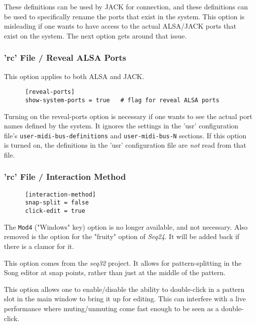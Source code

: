    These definitions can be used by JACK for connection, and these
   definitions can be used to specifically rename the ports that exist in the
   system.
   This option is misleading if one wants to have access to the
   actual ALSA/JACK ports that exist on the system.
   The next option gets around that issue.

\subsubsection{'rc' File / Reveal ALSA Ports}
\label{subsubsec:configuration_rc_reveal_ports}

   This option applies to both ALSA and JACK.

   \begin{verbatim}
      [reveal-ports]
      show-system-ports = true   # flag for reveal ALSA ports
   \end{verbatim}

   Turning on the reveal-ports option is necessary if one
   wants to see the actual port names defined by the system.
   It ignores the settings in the 'usr' configuration file's
   \texttt{user-midi-bus-definitions} and \texttt{user-midi-bus-N} sections.
   If this option is turned on, the definitions in the
   'usr' configuration file are \textsl{not} read from that file.

\subsubsection{'rc' File / Interaction Method}
\label{subsubsec:configuration_rc_interaction}

   \begin{verbatim}
      [interaction-method]
      snap-split = false
      click-edit = true
   \end{verbatim}

   The \texttt{Mod4} ("Windows" key) option is no longer available, and not
   necessary.
   Also removed is the option for the "fruity" option of \textsl{Seq24}.
   It will be added back if there is a clamor for it.

   This option comes from the \textsl{seq32} project.  It allows for
   pattern-splitting in the Song editor at snap points, rather than just
   at the middle of the pattern.

   This option allows one to enable/disable the ability to double-click
   in a pattern slot in the main window to bring it up for editing.
   This can interfere with a live performance where muting/unmuting come fast
   enough to be seen as a double-click.

